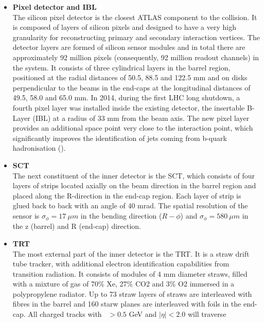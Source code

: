 	\begin{itemize}
		\item \textbf{Pixel detector and IBL}\\
	The silicon pixel detector is the closest ATLAS 
	component to the collision. It is composed of layers of
	silicon pixels and designed to have a very 
	high granularity for reconstructing primary 
	and secondary interaction vertices. 
	The detector layers are formed of silicon sensor modules and 
	in total there are approximately 92 million pixels 
	(consequently, 92 million readout channels) in the system.
	It consists of three cylindrical layers in the 
	barrel region, positioned at the radial distances of 
	50.5, 88.5 and 122.5 mm 
	and on disks perpendicular to the beams in the end-caps at the
	longitudinal distances of 49.5, 58.0 and 65.0 mm. 
	In 2014, during the first LHC long shutdown, a fourth pixel 
	layer was installed inside the existing detector, 
	the insertable B-Layer (IBL) at a radius of 33 mm 
	from the beam axis.
	The new pixel layer provides an 
	additional space point very close to the interaction point, 
	which significantly improves the identification of jets coming from 
	b-quark hadronisation (\bjets). 
	\item \textbf{SCT} \\
	The next constituent of the inner detector is the SCT, 
	which consists of four layers of strips located axially on the 
	beam direction in the barrel region and placed along the 
	\mbox{R-direction} in the end-cap region. 
	Each layer of strip is glued back to back with an angle of
	40 mrad. The spatial resolution of the sensor is 
	$\sigma_\phi = 17\ \mu m$ in the bending direction ($R-\phi$)
	and $\sigma_\phi = 580\ \mu m$ in the z (barrel) and R (end-cap) direction. 
	\item \textbf{TRT} \\
	The most external part of the inner detector is the TRT. 
	It is a straw drift tube tracker, with additional electron identification
	capabilities from transition radiation. It consists of
	modules of 4 mm diameter straws, filled with a mixture of gas of
	70\% Xe, 27\% CO2 and 3\% O2 immersed in a polypropylene radiator.
	Up to 73 straw layers of straws are interleaved with fibres in the barrel
	and 160 starw planes are interleaved with foils in the end-cap. 
	All charged tracks with \pt\ $> 0.5$ GeV and $|\eta| < 2.0$ will traverse 

\end{itemize}
